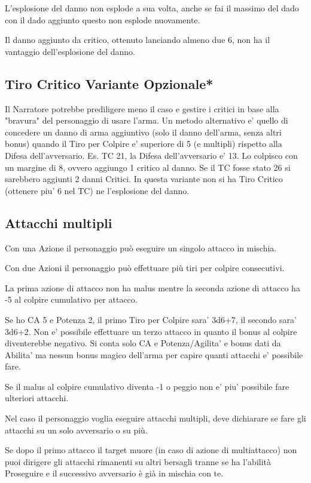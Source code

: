 \documentclass[a4paper,11pt,twoside,openany]{book}
\begin{document}
L'esplosione del danno non esplode a sua volta, anche se fai il massimo del dado con il dado aggiunto questo non esplode nuovamente.

Il danno aggiunto da critico, ottenuto lanciando almeno due 6, non ha il vantaggio dell'esplosione del danno.

\subsection{Tiro Critico Variante Opzionale*}

Il Narratore potrebbe prediligere meno il caso e gestire i critici in base alla "bravura" del personaggio di usare l'arma.
Un metodo alternativo e' quello di concedere un danno di arma aggiuntivo (solo il danno dell'arma, senza altri bonus) quando il Tiro per Colpire e' superiore di 5 (e multipli) rispetto alla Difesa dell'avversario.
Es. TC 21, la Difesa dell'avversario e' 13. Lo colpisco con un margine di 8, ovvero aggiungo 1 critico al danno.
Se il TC fosse stato 26 si sarebbero aggiunti 2 danni Critici.
In questa variante non si ha Tiro Critico (ottenere piu' 6 nel TC) ne l'esplosione del danno.


\subsection{Attacchi multipli}

Con una Azione il personaggio può eseguire un singolo attacco in mischia.

Con due Azioni il personaggio può effettuare più tiri per colpire consecutivi.

La prima azione di attacco non ha malus mentre la seconda azione di attacco ha -5 al colpire cumulativo per attacco.

Se ho CA 5 e Potenza 2, il primo Tiro per Colpire sara' 3d6+7, il secondo sara' 3d6+2. Non e' possibile effettuare un terzo attacco in quanto il bonus al colpire diventerebbe negativo.
Si conta solo CA e Potenza/Agilita' e bonus dati da Abilita' ma nessun bonus magico dell'arma per capire quanti attacchi e' possibile fare.

Se il malus al colpire cumulativo diventa -1 o peggio non e' piu' possibile fare ulteriori attacchi.

Nel caso il personaggio voglia eseguire attacchi multipli, deve dichiarare se fare gli attacchi su un solo avversario o su più.

Se dopo il primo attacco il target muore (in caso di azione di multiattacco) non puoi dirigere gli attacchi rimanenti su altri bersagli tranne se ha l'abilità Proseguire e il successivo avversario è già in mischia con te.
\end{document}
